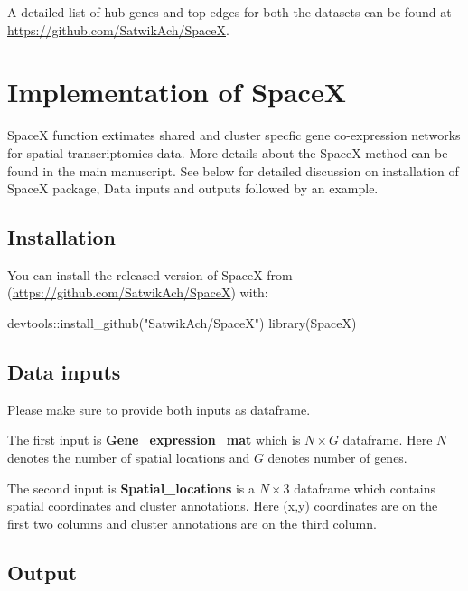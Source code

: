 \documentclass[
]{book}
\newenvironment{Shaded}{\begin{snugshade}}{\end{snugshade}}
\newcommand{\FunctionTok}[1]{\textcolor[rgb]{0.00,0.00,0.00}{#1}}
\newcommand{\NormalTok}[1]{#1}
\newcommand{\SpecialCharTok}[1]{\textcolor[rgb]{0.00,0.00,0.00}{#1}}
\newcommand{\StringTok}[1]{\textcolor[rgb]{0.31,0.60,0.02}{#1}}
\begin{document}
A detailed list of hub genes and top edges for both the datasets can be found at \url{https://github.com/SatwikAch/SpaceX}.

\hypertarget{Implement_SpaceX}{%
\chapter{Implementation of SpaceX}\label{Implement_SpaceX}}

SpaceX function extimates shared and cluster specfic gene co-expression networks for spatial transcriptomics data. More details about the SpaceX method can be found in the main manuscript. See below for detailed discussion on installation of SpaceX package, Data inputs and outputs followed by an example.

\hypertarget{installation}{%
\section{Installation}\label{installation}}

You can install the released version of SpaceX from (\url{https://github.com/SatwikAch/SpaceX}) with:

\begin{Shaded}
\begin{Highlighting}[]
\NormalTok{devtools}\SpecialCharTok{::}\FunctionTok{install\_github}\NormalTok{(}\StringTok{"SatwikAch/SpaceX"}\NormalTok{)}
\FunctionTok{library}\NormalTok{(SpaceX)}
\end{Highlighting}
\end{Shaded}

\hypertarget{data-inputs}{%
\section{Data inputs}\label{data-inputs}}

Please make sure to provide both inputs as dataframe.

The first input is \textbf{Gene\_expression\_mat} which is \(N \times G\) dataframe. Here \(N\) denotes the number of spatial locations and \(G\) denotes number of genes.

The second input is \textbf{Spatial\_locations} is a \(N \times 3\) dataframe which contains spatial coordinates and cluster annotations. Here (x,y) coordinates are on the first two columns and cluster annotations are on the third column.

\hypertarget{output}{%
\section{Output}\label{output}}
\end{document}
